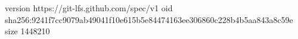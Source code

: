 version https://git-lfs.github.com/spec/v1
oid sha256:9241f7cc9079ab49041f10e615b5e84474163ee306860c228b4b5aa843a8c59e
size 1448210
